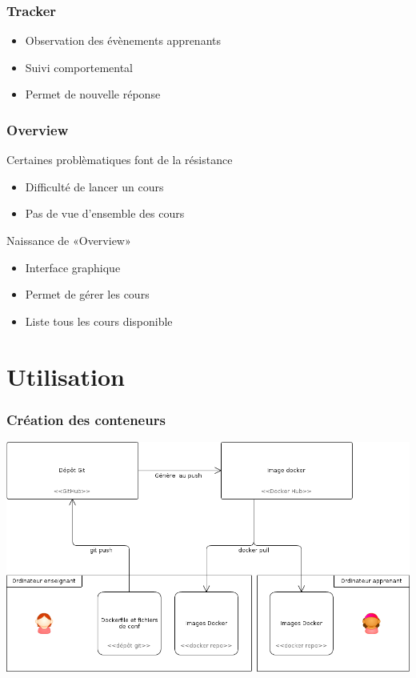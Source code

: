 \documentclass[10pt, compress]{beamer}
\begin{document}
\begin{frame}[fragile]
  \frametitle{Tracker}
  \begin{center}
    \begin{itemize}[<+- | alert@+>]
      \item Observation des évènements apprenants
      \item Suivi comportemental
      \item Permet de nouvelle réponse
    \end{itemize}
  \end{center}
\end{frame}

\begin{frame}[fragile]
  \frametitle{Overview}
  \begin{center}
    Certaines problèmatiques font de la résistance
    \pause
    \begin{itemize}[<+- | alert@+>]
      \item Difficulté de lancer un cours
      \item Pas de vue d'ensemble des cours
    \end{itemize}
    \pause
    Naissance de «Overview»
    \pause
    \begin{itemize}[<+- | alert@+>]
      \item Interface graphique
      \item Permet de gérer les cours
      \item Liste tous les cours disponible
    \end{itemize}
  \end{center}
\end{frame}

\section{Utilisation}

\begin{frame}[fragile]
  \frametitle{Création des conteneurs}
  \begin{center}
  \includegraphics[scale = 0.35]{infrastructure-creation.png}
   \end{center}
\end{frame}
\end{document}
